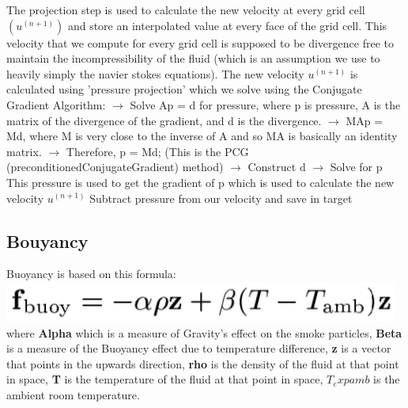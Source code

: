 \documentclass[11pt,letterpaper]{article}
\begin{document}
	The projection step is used to calculate the new velocity at every grid cell $(u^(n+1))$ and 
	store an interpolated value at every face of the grid cell.
	\newline \newline
	This velocity that we compute for every grid cell is supposed to be divergence free to maintain
	the incompressibility of the fluid (which is an assumption we use to heavily simply the navier 
	stokes equations).
	\newline \newline
    The new velocity $u^{(n+1)}$ is calculated using 'pressure projection' which we solve using the 
	Conjugate Gradient Algorithm: \newline
	\hspace{10mm} $\rightarrow$ Solve Ap = d for pressure, where p is pressure, A is the matrix of the divergence of the gradient, and d is the divergence. \newline
	\hspace{10mm} $\rightarrow$ MAp = Md, where M is very close to the inverse of A and so MA is basically an identity matrix. \newline
	\hspace{10mm} $\rightarrow$ Therefore, p = Md; (This is the PCG (preconditionedConjugateGradient) method) \newline
	\hspace{10mm} $\rightarrow$ Construct d \newline
	\hspace{10mm} $\rightarrow$ Solve for p \newline
    \newline
	This pressure is used to get the gradient of p which is used to calculate the new velocity $u^{(n+1)}$
	\newline
    Subtract pressure from our velocity and save in target

\subsection{Bouyancy}

Buoyancy is based on this formula: \newline
\includegraphics[width=13cm]{Buoyancy.png} \newline
where 
\textbf{Alpha} which is a measure of Gravity's effect on the smoke particles, \newline
\textbf{Beta} is a measure of the Buoyancy effect due to temperature difference, \newline
\textbf{z} is a vector that points in the upwards direction, \newline
\textbf{rho} is the density of the fluid at that point in space, \newline
\textbf{T} is the temperature of the fluid at that point in space, \newline
\textbf{$T_exp{amb}$} is the ambient room temperature.
\end{document}

